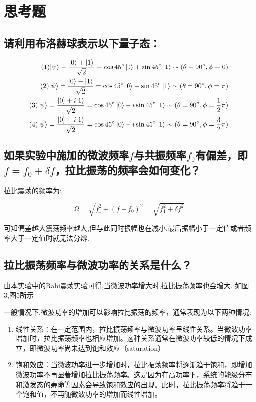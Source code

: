 \documentclass[a4paper,UTF8]{ctexart}
\begin{document}
\section{思考题}

\subsection{请利用布洛赫球表示以下量子态：}

\begin{align}
    (1) |\psi\rangle=\frac{|0\rangle+|1\rangle}{\sqrt{2}} = \cos{45^{\circ}} \ket{0} + \sin{45^{\circ} \ket{1} \sim (\theta = 90^{\circ},\phi = 0)}\\
    (2) |\psi\rangle=\frac{|0\rangle-|1\rangle}{\sqrt{2}} = \cos{45^{\circ}} \ket{0} - \sin{45^{\circ} \ket{1} \sim (\theta = 90^{\circ},\phi = \pi)}\\
    (3) |\psi\rangle=\frac{|0\rangle+i|1\rangle}{\sqrt{2}} = \cos{45^{\circ}} \ket{0} + i \sin{45^{\circ} \ket{1} \sim (\theta = 90^{\circ},\phi = \frac{1}{2}\pi)}\\
    (4) |\psi\rangle=\frac{|0\rangle-i|1\rangle}{\sqrt{2}} = \cos{45^{\circ}} \ket{0} - i \sin{45^{\circ} \ket{1} \sim (\theta = 90^{\circ},\phi = \frac{3}{2}\pi)}
\end{align}

\subsection{如果实验中施加的微波频率$f$与共振频率$f_0$有偏差，即$f=f_0+\delta f$，拉比振荡的频率会如何变化？}

拉比震荡的频率为:

\begin{equation}
    \Omega = \sqrt{f_1^2 + (f- f_0)^2} = \sqrt{f_1^2 + \delta f^2}
\end{equation}

可知偏差越大震荡频率越大,但与此同时振幅也在减小.最后振幅小于一定值或者频率大于一定值时就无法分辨.

\subsection{拉比振荡频率与微波功率的关系是什么？}

由本实验中的Rabi震荡实验可得,当微波功率增大时,拉比振荡频率也会增大.
如图3,图5所示

一般情况下,微波功率的增加可以影响拉比振荡的频率，通常表现为以下两种情况:

\begin{enumerate}
    \item 线性关系：在一定范围内，拉比振荡频率与微波功率呈线性关系。当微波功率增加时，拉比振荡频率也相应增加。这种关系通常在微波功率较低的情况下成立，即微波功率尚未达到饱和效应（saturation）
    \item 饱和效应：当微波功率进一步增加时，拉比振荡频率将逐渐趋于饱和，即增加微波功率不再显著增加拉比振荡频率。这是因为在高功率下，系统的能级分布和激发态的寿命等因素会导致饱和效应的出现。此时，拉比振荡频率将趋于一个饱和值，不再随微波功率的增加而线性增加。
\end{enumerate}
\end{document}
